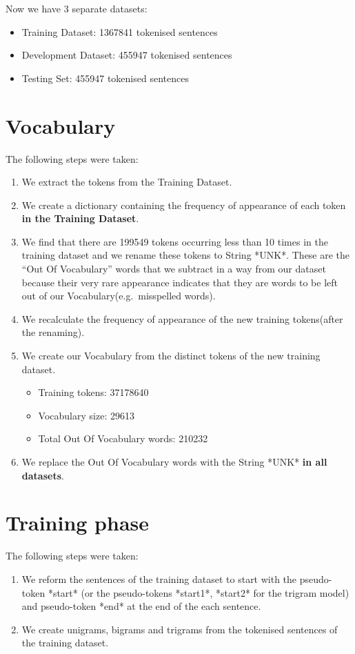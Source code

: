 \documentclass[12pt]{article}
\begin{document}
Now we have 3 separate datasets:
\begin{itemize}	
	\item Training Dataset:	1367841 tokenised sentences	
	\item Development Dataset: 455947 tokenised sentences	
	\item Testing Set: 455947 tokenised sentences	
\end{itemize}

\section{Vocabulary}
The following steps were taken:
\begin{enumerate}[Step 1:]
	\item We extract the tokens from the Training Dataset.
	\item We create a dictionary containing the frequency of appearance of each token \textbf{in the Training Dataset}.
	\item We find that there are 199549 tokens occurring less than 10 times in the training dataset and we
	rename these tokens to String *UNK*. These are the “Out Of Vocabulary” words that we subtract in
	a way from our dataset because their very rare appearance indicates that they are words to be left
	out of our Vocabulary(e.g.\ misspelled words).
	\item We recalculate the frequency of appearance of the new training tokens(after the renaming).
	\item We create our Vocabulary from the distinct tokens of the new training dataset.
	\begin{itemize}	
		\item Training tokens: 37178640
		\item Vocabulary size: 29613	
		\item Total Out Of Vocabulary words: 210232	
	\end{itemize}
	\item We replace the Out Of Vocabulary words with the String *UNK* \textbf{in all datasets}.
\end{enumerate}

\section{Training phase}
The following steps were taken:
\begin{enumerate}[Step 1:]
	\item We reform the sentences of the training dataset to start with the pseudo-token *start* (or the
	pseudo-tokens *start1*, *start2* for the trigram model) and pseudo-token *end* at the end of the
	each sentence.
	\item We create unigrams, bigrams and trigrams from the tokenised sentences of the training dataset.
\end{enumerate}
\end{document}

